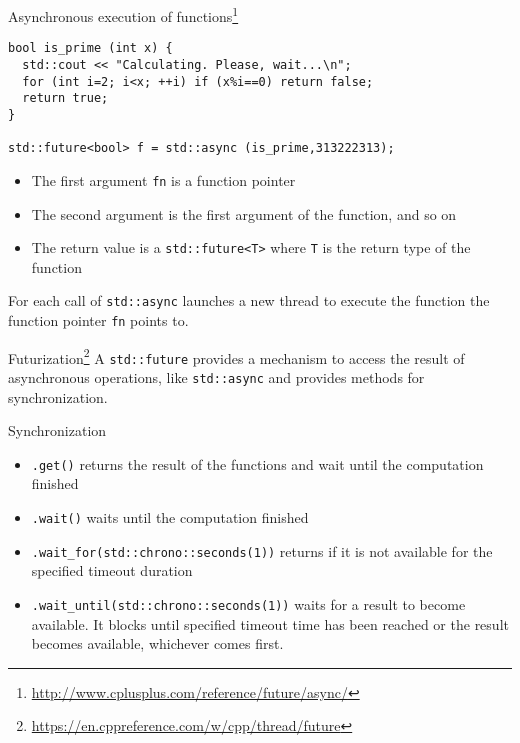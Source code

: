 \documentclass[\classoption]{beamer}
\begin{document}
\begin{frame}[fragile]{Asynchronous execution of functions\footnote{\tiny\url{http://www.cplusplus.com/reference/future/async/}}}

\begin{lstlisting}
bool is_prime (int x) {
  std::cout << "Calculating. Please, wait...\n";
  for (int i=2; i<x; ++i) if (x%i==0) return false;
  return true;
}

std::future<bool> f = std::async (is_prime,313222313);

\end{lstlisting}

\begin{itemize}
\item The first argument \lstinline|fn| is a function pointer
\item The second argument is the first argument of the function, and so on
\item The return value is a \lstinline|std::future<T>| where \lstinline|T| is the return type of the function
\end{itemize}
For each call of \lstinline|std::async| launches a new thread to execute the function the function pointer \lstinline|fn| points to. 
\end{frame}


\begin{frame}{Futurization\footnote{\tiny\url{https://en.cppreference.com/w/cpp/thread/future}}}
A \lstinline|std::future| provides a mechanism to access the result of asynchronous operations, like \lstinline|std::async| and provides methods for synchronization.

\begin{block}{Synchronization}

\begin{itemize}
\item \lstinline|.get()| returns the result of the functions and wait until the computation finished
\item \lstinline|.wait()| waits until the computation finished
\item \lstinline|.wait_for(std::chrono::seconds(1))| returns if it is not available for the specified timeout duration 
\item \lstinline|.wait_until(std::chrono::seconds(1))| waits for a result to become available. It blocks until specified timeout time has been reached or the result becomes available, whichever comes first. 
\end{itemize}

\end{block}
\end{frame}
\end{document}
